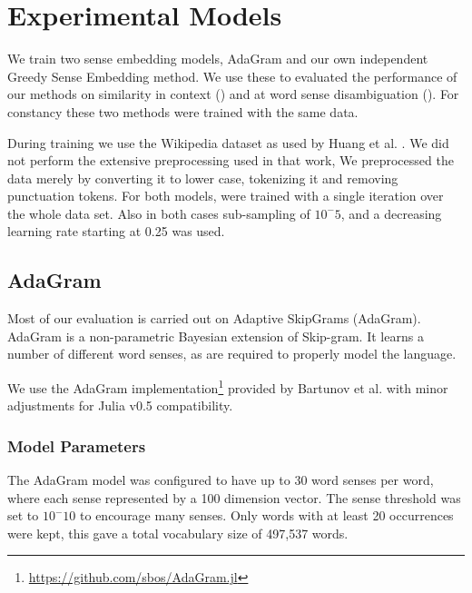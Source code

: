 \documentclass{sig-alternate}
\begin{document}
\section{Experimental Models}
We train two sense embedding models, AdaGram \parencite{AdaGrams} and our own independent Greedy Sense Embedding method. We use these to evaluated the performance of our methods on similarity in context () and at word sense disambiguation (). For constancy these two methods were trained with the same data.

During training we use the Wikipedia dataset as used by Huang et al. \parencite{Huang2012}.
We did not perform the extensive preprocessing used in that work,
We preprocessed the data merely by converting it to lower case, tokenizing it and removing punctuation tokens.
For both models, were trained with a single iteration over the whole data set.
Also in both cases sub-sampling of $10^-5$, and a decreasing learning rate starting at 0.25 was used.

\subsection{AdaGram}
Most of our evaluation is carried out on Adaptive SkipGrams (AdaGram)\parencite{AdaGrams}. AdaGram is a non-parametric Bayesian extension of Skip-gram. It learns a number of different word senses, as are required to properly model the language.

We use the AdaGram \parencite{AdaGrams} implementation\footnote{\url{https://github.com/sbos/AdaGram.jl}} provided by Bartunov et al. with minor adjustments for Julia \parencite{Julia} v0.5 compatibility.

\subsubsection{Model Parameters}

The AdaGram model was configured to have up to 30 word senses per word, where each sense represented by a 100 dimension vector. The sense threshold was set to $10^-10$ to encourage many senses.
Only words with at least 20 occurrences were kept, this gave a total vocabulary size of 497,537 words.




\end{document}
